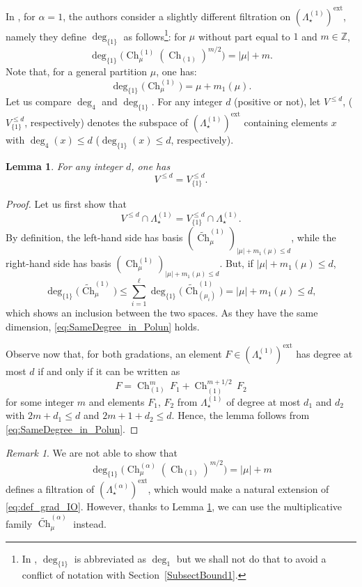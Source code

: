 \documentclass[11pt]{amsart}
\theoremstyle{plain}
\newtheorem{lemma}{Lemma}[section]
\theoremstyle{remark}
\newtheorem*{remark}{Remark}
\newcommand{\Z}{\mathbb{Z}}
\newcommand{\Polun}{\Lambda_\star^{(1)}}
\newcommand{\Polaext}{\left(\Lambda_\star^{(\alpha)}\right)^{\ext}}
\newcommand{\Poluext}{\left(\Lambda_\star^{(1)}\right)^{\ext}}
\DeclareMathOperator{\Ch}{Ch}
\DeclareMathOperator{\ext}{ext}
\begin{document}
In \cite{IvanovOlshanski2002}, for $\alpha=1$, the authors consider a slightly different filtration
on $\Poluext$, namely they define $\deg_{\{1\}}$ as follows\footnote{In \cite{IvanovOlshanski2002}, $\deg_{\{1\}}$ is
abbreviated as $\deg_{1}$ but we shall not do that to avoid a conflict of notation with Section~\ref{SubsectBound1}.}:
for $\mu$ without part equal to $1$ and $m \in \Z$,
\begin{equation}
    \label{eq:def_grad_IO}
    \deg_{\{1\}}\bigg(\Ch^{(1)}_\mu \left(\Ch_{(1)}\right)^{m/2}\bigg) = |\mu|+m.
\end{equation}
Note that, for a general partition $\mu$, one has:
\[ \deg_{\{1\}}\big( \Ch^{(1)}_\mu \big) = \mu + m_1(\mu).\]
Let us compare $\deg_4$ and $\deg_{\{1\}}$.
For any integer $d$ (positive or not),
let $V^{\le d}$, ($V^{\le d}_{\{1\}}$, respectively) denotes the subspace of $\Poluext$ containing elements $x$
with $\deg_4(x)\le d$ ($\deg_{\{1\}}(x)\le d$, respectively).
\begin{lemma}
    For any integer $d$, one has
    \[V^{\le d}=V^{\le d}_{\{1\}}.\]
    \label{lem:ComparisonDegree}
\end{lemma}
\begin{proof}
    Let us first show that
    \begin{equation}
        \label{eq:SameDegree_in_Polun}
        V^{\le d} \cap \Polun =V^{\le d}_{\{1\}} \cap \Polun.
    \end{equation}
    By definition, the left-hand side has basis $(\widetilde{\Ch}^{(1)}_\mu)_{|\mu|+m_1(\mu) \le d}$,
    while the right-hand side has basis $(\Ch^{(1)}_\mu)_{|\mu|+m_1(\mu) \le d}$.
    But, if $|\mu|+m_1(\mu) \le d$,
    \[\deg_{\{1\}} \big(\widetilde{\Ch}^{(1)}_\mu \big)
    \leq \sum_{i=1}^\ell \deg_{\{1\}} \big(\widetilde{\Ch}^{(1)}_{(\mu_i)} \big) = |\mu|+m_1(\mu) \le d,\]
    which shows an inclusion between the two spaces.
    As they have the same dimension, \eqref{eq:SameDegree_in_Polun} holds.

    Observe now that, for both gradations,
    an element $F \in \Poluext$ has degree at most $d$
    if and only if it can be written as
    \[F = \Ch_{(1)}^m \, F_1 + \Ch_{(1)}^{m+1/2} \, F_2 \]
    for some integer $m$ and elements $F_1$, $F_2$ from $\Polun$
    of degree at most $d_1$ and $d_2$ with $2m+d_1 \le d$ and
    $2m+1+d_2 \le d$.
    Hence, the lemma follows from \eqref{eq:SameDegree_in_Polun}.
\end{proof}



\begin{remark}
    We are not able to show that
    \[\deg_{\{1\}}\bigg(\Ch^{(\alpha)}_\mu \left(\Ch_{(1)}\right)^{m/2}\bigg) = |\mu|+m\]
    defines a filtration of $\Polaext$, which would make a natural extension of \eqref{eq:def_grad_IO}. However, thanks to Lemma \ref{lem:ComparisonDegree}, we can use the multiplicative family $\widetilde{\Ch}^{(\alpha)}_\mu$ instead.
\end{remark}
\end{document}
